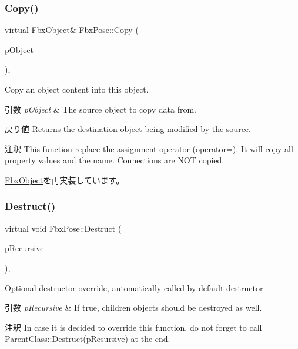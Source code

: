 \subsubsection{\texorpdfstring{Copy()}{Copy()}}
{\footnotesize\ttfamily virtual \hyperlink{class_fbx_object}{Fbx\+Object}\& Fbx\+Pose\+::\+Copy (\begin{DoxyParamCaption}\item[{const \hyperlink{class_fbx_object}{Fbx\+Object} \&}]{p\+Object }\end{DoxyParamCaption})\hspace{0.3cm}{\ttfamily [protected]}, {\ttfamily [virtual]}}

Copy an object content into this object. 
\begin{DoxyParams}{引数}
{\em p\+Object} & The source object to copy data from. \\
\hline
\end{DoxyParams}
\begin{DoxyReturn}{戻り値}
Returns the destination object being modified by the source. 
\end{DoxyReturn}
\begin{DoxyRemark}{注釈}
This function replace the assignment operator (operator=). It will copy all property values and the name. Connections are N\+OT copied. 
\end{DoxyRemark}


\hyperlink{class_fbx_object_a0c0c5adb38284d14bb82c04d54504a3e}{Fbx\+Object}を再実装しています。

\mbox{\label{class_fbx_pose_a9c7e0d61d4d7cbec51a01352e25678d5}} 
\subsubsection{\texorpdfstring{Destruct()}{Destruct()}}
{\footnotesize\ttfamily virtual void Fbx\+Pose\+::\+Destruct (\begin{DoxyParamCaption}\item[{bool}]{p\+Recursive }\end{DoxyParamCaption})\hspace{0.3cm}{\ttfamily [protected]}, {\ttfamily [virtual]}}

Optional destructor override, automatically called by default destructor. 
\begin{DoxyParams}{引数}
{\em p\+Recursive} & If true, children objects should be destroyed as well. \\
\hline
\end{DoxyParams}
\begin{DoxyRemark}{注釈}
In case it is decided to override this function, do not forget to call Parent\+Class\+::\+Destruct(p\+Resursive) at the end. 
\end{DoxyRemark}


